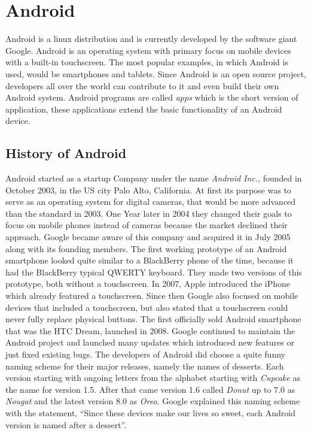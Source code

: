 \chapter{Android}
\label{ch:Android}

\author{Nico Leidenfrost}
%
Android is a linux distribution and is currently developed by the software giant Google. Android is an operating system with primary focus on mobile devices with a built-in touchscreen. The most popular examples, in which Android is used, would be smartphones and tablets. Since Android is an open source project, developers all over the world can contribute to it and even build their own Android system. Android programs are called \textit{apps} which is the short version of application, these applications extend the basic functionality of an Android device.

\section{History of Android}
Android started as a startup Company under the name \textit{Android Inc.}, founded in October 2003, in the US city Palo Alto, California. At first its purpose was to serve as an operating system for digital cameras, that would be more advanced than the standard in 2003. One Year later in 2004 they changed their goals to focus on mobile phones instead of cameras because the market declined their approach. Google became aware of this company and acquired it in July 2005 along with its founding members. The first working prototype of an Android smartphone looked quite similar to a BlackBerry phone of the time, because it had the BlackBerry typical QWERTY keyboard. They made two versions of this prototype, both without a touchscreen. In 2007, Apple introduced the iPhone which already featured a touchscreen. Since then Google also focused on mobile devices that included a touchscreen, but also stated that a touchscreen could never fully replace physical buttons. The first officially sold Android smartphone that was the HTC Dream, launched in 2008. Google continued to maintain the Android project and launched many updates which introduced new features or just fixed existing bugs. The developers of Android did choose a quite funny naming scheme for their major releases, namely the names of desserts. Each version starting with ongoing letters from the alphabet starting with \textit{Cupcake} as the name for version 1.5. After that came version 1.6 called \textit{Donut} up to 7.0 as \textit{Nougat} and the latest version 8.0 as \textit{Oreo}. Google explained this naming scheme with the statement, ``Since these devices make our lives so sweet, each Android version is named after a dessert''.

